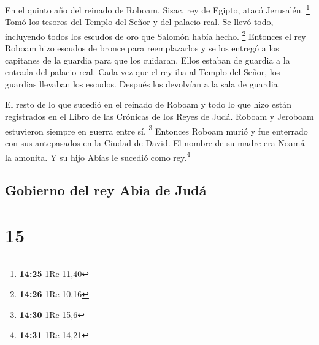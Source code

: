  En el quinto año del reinado de Roboam, Sisac, rey de
Egipto, atacó Jerusalén. \footnote{\textbf{14:25} 1Re 11,40}
 Tomó los tesoros del Templo del Señor y del palacio
real. Se llevó todo, incluyendo todos los escudos de oro que Salomón
había hecho. \footnote{\textbf{14:26} 1Re 10,16} 
Entonces el rey Roboam hizo escudos de bronce para reemplazarlos y se
los entregó a los capitanes de la guardia para que los cuidaran. Ellos
estaban de guardia a la entrada del palacio real.  Cada
vez que el rey iba al Templo del Señor, los guardias llevaban los
escudos. Después los devolvían a la sala de guardia.

 El resto de lo que sucedió en el reinado de Roboam y
todo lo que hizo están registrados en el Libro de las Crónicas de los
Reyes de Judá.  Roboam y Jeroboam estuvieron siempre en
guerra entre sí. \footnote{\textbf{14:30} 1Re 15,6} 
Entonces Roboam murió y fue enterrado con sus antepasados en la Ciudad
de David. El nombre de su madre era Noamá la amonita. Y su hijo Abías le
sucedió como rey.\footnote{\textbf{14:31} 1Re 14,21}

\hypertarget{gobierno-del-rey-abia-de-juduxe1}{%
\subsection{Gobierno del rey Abia de
Judá}\label{gobierno-del-rey-abia-de-juduxe1}}

\hypertarget{section-14}{%
\section{15}\label{section-14}}


